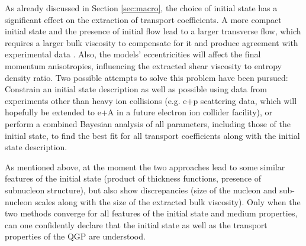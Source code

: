 As already discussed in Section \ref{sec:macro}, the choice of initial state has a significant effect on the extraction of transport coefficients. A more compact initial state and the presence of initial flow lead to a larger transverse flow, which requires a larger bulk viscosity to compensate for it and produce agreement with experimental data \cite{Schenke:2018fci}. Also, the models' eccentricities will affect the final momentum anisotropies, influencing the extracted shear viscosity to entropy density ratio. Two possible attempts to solve this problem have been pursued: Constrain an initial state description as well as possible using data from experiments other than heavy ion collisions (e.g. e+p scattering data, which will hopefully be extended to e+A in a future electron ion collider facility), or perform a combined Bayesian analysis of all parameters, including those of the initial state, to find the best fit for all transport coefficients along with the initial state description.

As mentioned above, at the moment the two approaches lead to some similar features of the initial state (product of thickness functions, presence of subnucleon structure), but also show discrepancies (size of the nucleon and sub-nucleon scales along with the size of the extracted bulk viscosity). Only when the two methods converge for all features of the initial state and medium properties, can one confidently declare that the initial state as well as the transport properties of the QGP are understood.
